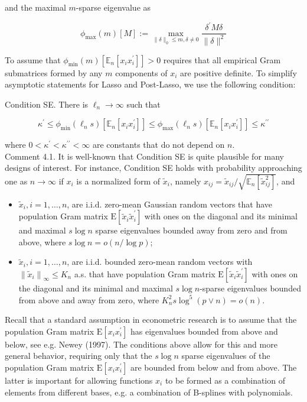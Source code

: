 \documentclass[10pt]{article}
\begin{document}
and the maximal \(m\)-sparse eigenvalue as

\[
\phi_{\max }(m)[M]:=\max _{\|\delta\|_{0} \leqslant m, \delta \neq 0} \frac{\delta^{\prime} M \delta}{\|\delta\|^{2}}
\]

To assume that \(\phi_{\min }(m)\left[\mathbb{E}_{n}\left[x_{i} x_{i}^{\prime}\right]\right]>0\) requires that all empirical Gram submatrices formed by any \(m\) components of \(x_{i}\) are positive definite. To simplify asymptotic statements for Lasso and Post-Lasso, we use the following condition:

Condition SE. There is \(\ell_{n} \rightarrow \infty\) such that

\[
\kappa^{\prime} \leqslant \phi_{\min }\left(\ell_{n} s\right)\left[\mathbb{E}_{n}\left[x_{i} x_{i}^{\prime}\right]\right] \leqslant \phi_{\max }\left(\ell_{n} s\right)\left[\mathbb{E}_{n}\left[x_{i} x_{i}^{\prime}\right]\right] \leqslant \kappa^{\prime \prime}
\]

where \(0<\kappa^{\prime}<\kappa^{\prime \prime}<\infty\) are constants that do not depend on \(n\).\\
Comment 4.1. It is well-known that Condition SE is quite plausible for many designs of interest. For instance, Condition SE holds with probability approaching one as \(n \rightarrow \infty\) if \(x_{i}\) is a normalized form of \(\tilde{x}_{i}\), namely \(x_{i j}=\tilde{x}_{i j} / \sqrt{\mathbb{E}_{n}\left[\tilde{x}_{i j}^{2}\right]}\), and

\begin{itemize}
  \item \(\tilde{x}_{i}, i=1, \ldots, n\), are i.i.d. zero-mean Gaussian random vectors that have population Gram matrix \(\mathrm{E}\left[\tilde{x}_{i} \tilde{x}_{i}^{\prime}\right]\) with ones on the diagonal and its minimal and maximal \(s \log n\) sparse eigenvalues bounded away from zero and from above, where \(s \log n=o(n / \log p)\);
  \item \(\tilde{x}_{i}, i=1, \ldots, n\), are i.i.d. bounded zero-mean random vectors with \(\left\|\tilde{x}_{i}\right\|_{\infty} \leqslant K_{n}\) a.s. that have population Gram matrix \(\mathrm{E}\left[\tilde{x}_{i} \tilde{x}_{i}^{\prime}\right]\) with ones on the diagonal and its minimal and maximal \(s \log n\)-sparse eigenvalues bounded from above and away from zero, where \(K_{n}^{2} s \log ^{5}(p \vee n)=o(n)\).
\end{itemize}

Recall that a standard assumption in econometric research is to assume that the population Gram matrix \(\mathrm{E}\left[x_{i} x_{i}^{\prime}\right]\) has eigenvalues bounded from above and below, see e.g. Newey (1997). The conditions above allow for this and more general behavior, requiring only that the \(s \log n\) sparse eigenvalues of the population Gram matrix \(\mathrm{E}\left[x_{i} x_{i}^{\prime}\right]\) are bounded from below and from above. The latter is important for allowing functions \(x_{i}\) to be formed as a combination of elements from different bases, e.g. a combination of B-splines with polynomials.
\end{document}

